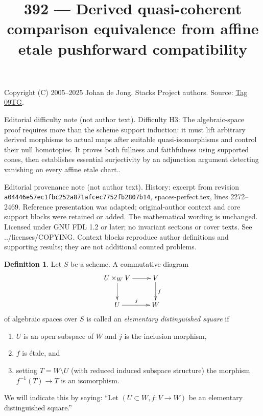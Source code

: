 \documentclass{amsart}
\theoremstyle{plain}
\theoremstyle{definition}
\newtheorem{definition}[subsection]{Definition}
\theoremstyle{remark}
\numberwithin{equation}{subsection}
\begin{document}
\title[Stacks Project, Tag 09TG]{392 --- Derived quasi-coherent comparison equivalence from affine etale pushforward compatibility}
\maketitle
\noindent Copyright (C) 2005--2025 Johan de Jong. Stacks Project authors. Source: \href{https://stacks.math.columbia.edu/tag/09TG}{Tag 09TG}.

\noindent Editorial difficulty note (not author text). Difficulty H3: The algebraic-space proof requires more than the scheme support induction: it must lift arbitrary derived morphisms to actual maps after suitable quasi-isomorphisms and control their null homotopies. It proves both fullness and faithfulness using supported cones, then establishes essential surjectivity by an adjunction argument detecting vanishing on every affine etale chart..

\noindent Editorial provenance note (not author text). History: excerpt from revision \texttt{a0444\allowbreak 6e57e\allowbreak c1fbc\allowbreak 252a8\allowbreak 71afc\allowbreak ec775\allowbreak 2fb28\allowbreak 07b14}, spaces-perfect.tex, lines 2272--2469. Reference presentation was adapted; original-author context and core support blocks were retained or added. The mathematical wording is unchanged. Licensed under GNU FDL 1.2 or later; no invariant sections or cover texts. See ../licenses/COPYING. Context blocks reproduce author definitions and supporting results; they are not additional counted problems.

\begin{definition}
\label{definition-elementary-distinguished-square}
Let $S$ be a scheme. A commutative diagram
$$
\xymatrix{
U \times_W V \ar[r] \ar[d] & V \ar[d]^f \\
U \ar[r]^j & W
}
$$
of algebraic spaces over $S$ is called an {\it elementary distinguished square}
if
\begin{enumerate}
\item $U$ is an open subspace of $W$ and $j$ is the inclusion morphism,
\item $f$ is \'etale, and
\item setting $T = W \setminus U$ (with reduced induced
subspace structure) the morphism $f^{-1}(T) \to T$ is an isomorphism.
\end{enumerate}
We will indicate this by saying: ``Let $(U \subset W, f : V \to W)$
be an elementary distinguished square.''
\end{definition}
\end{document}
